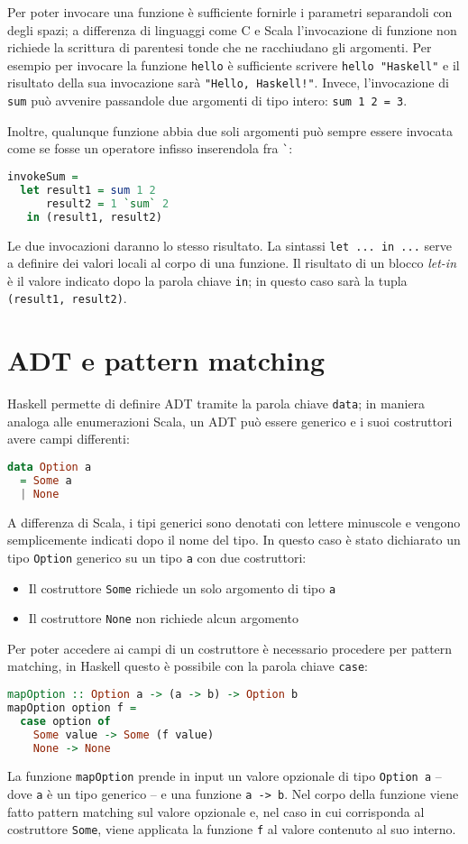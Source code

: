 Per poter invocare una funzione è sufficiente fornirle i parametri separandoli con degli spazi; a differenza di linguaggi come C e Scala l'invocazione di funzione non richiede la scrittura di parentesi tonde che ne racchiudano gli argomenti. Per esempio per invocare la funzione \lstinline{hello} è sufficiente scrivere \lstinline{hello "Haskell"} e il risultato della sua invocazione sarà \lstinline{"Hello, Haskell!"}.
Invece, l'invocazione di \lstinline{sum} può avvenire passandole due argomenti di tipo intero: \lstinline{sum 1 2 = 3}.

Inoltre, qualunque funzione abbia due soli argomenti può sempre essere invocata come se fosse un operatore infisso inserendola fra \lstinline{`}:
\begin{lstlisting}[language=haskell]
invokeSum =
  let result1 = sum 1 2
      result2 = 1 `sum` 2
   in (result1, result2)
\end{lstlisting}
Le due invocazioni daranno lo stesso risultato. La sintassi \lstinline{let ... in ...} serve a definire dei valori locali al corpo di una funzione.
Il risultato di un blocco \emph{let-in} è il valore indicato dopo la parola chiave \lstinline{in}; in questo caso sarà la tupla \lstinline{(result1, result2)}.

\section{ADT e pattern matching}
Haskell permette di definire ADT tramite la parola chiave \lstinline{data}; in maniera analoga alle enumerazioni Scala, un ADT può essere generico e i suoi costruttori avere campi differenti:
\begin{lstlisting}[language=haskell]
data Option a
  = Some a
  | None
\end{lstlisting}
A differenza di Scala, i tipi generici sono denotati con lettere minuscole e vengono semplicemente indicati dopo il nome del tipo. In questo caso è stato dichiarato un tipo \lstinline{Option} generico su un tipo \lstinline{a} con due costruttori:
\begin{itemize}
  \item Il costruttore \lstinline{Some} richiede un solo argomento di tipo \lstinline{a}
  \item Il costruttore \lstinline{None} non richiede alcun argomento
\end{itemize}

Per poter accedere ai campi di un costruttore è necessario procedere per pattern matching, in Haskell questo è possibile con la parola chiave \lstinline{case}:
\begin{lstlisting}[language=haskell]
mapOption :: Option a -> (a -> b) -> Option b
mapOption option f =
  case option of
    Some value -> Some (f value)
    None -> None 
\end{lstlisting}
La funzione \lstinline{mapOption} prende in input un valore opzionale di tipo \lstinline{Option a} -- dove \lstinline{a} è un tipo generico -- e una funzione \lstinline{a -> b}. Nel corpo della funzione viene fatto pattern matching sul valore opzionale e, nel caso in cui corrisponda al costruttore \lstinline{Some}, viene applicata la funzione \lstinline{f} al valore contenuto al suo interno.

